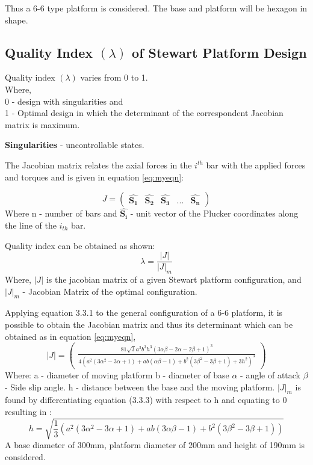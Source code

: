 Thus a 6-6 type platform is considered. The base and platform will be hexagon in shape.

\subsection{Quality Index $(\lambda)$ of Stewart Platform Design}
Quality index $(\lambda)$ varies from 0 to 1.\\
Where,\\
0 - design with singularities and\\
1 - Optimal design in which the determinant of the correspondent Jacobian matrix is maximum.

\textbf{Singularities} - uncontrollable states.

The Jacobian matrix relates the axial forces in the $i^{th}$ bar with the applied
forces and torques and is given in equation \eqref{eq:myeqn}:

\begin{equation}
J =
\begin{pmatrix}
\hat{\boldsymbol{S_{1}}} & \hat{\boldsymbol{S_{2}}} & \hat{\boldsymbol{S_{3}}} & ... & \hat{\boldsymbol{S_{n}}}
\end{pmatrix}
\label{eq:myeqn}
\end{equation}
Where n - number of bars and $ \hat{\boldsymbol{S_{i}}}$ - unit vector of the Plucker coordinates along the line of the
$i_{th}$ bar.

Quality index can be obtained as shown:
\begin{equation}
\lambda = \frac{|J|}{|J|_{m}}
\label{eq:myeqn}
\end{equation}
Where, $|J|$ is the jacobian matrix of a given Stewart platform configuration, and $ |J|_{m} $ - Jacobian Matrix of the optimal configuration.

Applying equation 3.3.1 to the general configuration of a 6-6 platform, it is
possible to obtain the Jacobian matrix and thus its determinant which can be obtained as in equation \eqref{eq:myeqn},
\begin{equation}
|J| =
\begin{pmatrix}
\frac{81 \sqrt{3} a^3 b^3 h^3 (3 \alpha \beta - 2 \alpha - 2 \beta +1)^3}{4(a^2(3 \alpha^2 - 3 \alpha + 1)+ ab(\alpha \beta - 1 )+ b^2(3 \beta^2 - 3 \beta + 1)+ 3h^2)^3}
\end{pmatrix}
\label{eq:myeqn}
\end{equation}
Where: a - diameter of moving platform
b - diameter of base
$\alpha$ - angle of attack
$ \beta $ - Side slip angle.
h - distance between the base and the moving platform.
$|J|_{m}$ is found by differentiating equation (3.3.3) with respect to h and equating to 0 resulting in \cite{fernandes_design_nodate}:
\begin{equation}
h = \sqrt{\frac{1}{3}(a^2 (3 \alpha^2 - 3 \alpha + 1)+ ab (3\alpha\beta - 1)+b^2(3 \beta^2 - 3 \beta + 1))}
\label{eq:myeqn}
\end{equation}
A base diameter of 300mm, platform diameter of 200mm and height of 190mm is considered.

